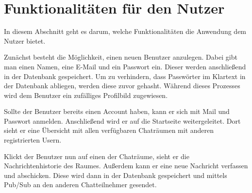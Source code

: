 
\section{Funktionalitäten für den Nutzer}

In diesem Abschnitt geht es darum, welche Funktionalitäten die Anwendung dem Nutzer bietet.

Zunächst besteht die Möglichkeit, einen neuen Benutzer anzulegen. Dabei gibt man einen Namen, eine E-Mail und ein Passwort ein.
Dieser werden anschließend in der Datenbank gespeichert. Um zu verhindern, dass Passwörter im Klartext in der Datenbank abliegen, werden diese zuvor gehasht.
Während dieses Prozesses wird dem Benutzer ein zufälliges Profilbild zugewiesen.

Sollte der Benutzer bereits einen Account haben, kann er sich mit Mail und Passwort anmelden.
Anschließend wird er auf die Startseite weitergeleitet. Dort sieht er eine Übersicht mit allen verfügbaren Chaträumen mit anderen registrierten Usern.

Klickt der Benutzer nun auf einen der Chaträume, sieht er die Nachrichtenhistorie des Raumes. Außerdem kann er eine neue Nachricht verfassen und abschicken.
Diese wird dann in der Datenbank gespeichert und mittels \acs{Pub/Sub} an den anderen Chatteilnehmer gesendet.
